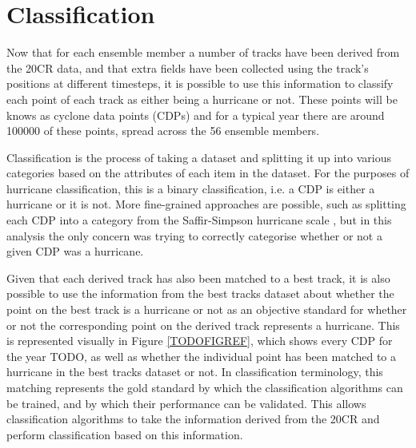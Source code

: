 \documentclass[pdftex,12pt,a4paper]{report}
\begin{document}



\section{Classification}


Now that for each ensemble member a number of tracks have been derived from the 20CR data, and that
extra fields have been collected using the track's positions at different timesteps, it is possible
to use this information to classify each point of each track as either being a hurricane or not.
These points will be knows as cyclone data points (CDPs) and for a typical year there are around
100000 of these points, spread across the 56 ensemble members.

Classification is the process of taking a dataset and splitting it up into various categories based
on the attributes of each item in the dataset. For the purposes of hurricane classification, this is
a binary classification, i.e. a CDP is either a hurricane or it is not. More fine-grained approaches
are possible, such as splitting each CDP into a category from the Saffir-Simpson hurricane scale
\parencite{TODOCITE}, but in this analysis the only concern was trying to correctly categorise whether or
not a given CDP was a hurricane.

Given that each derived track has also been matched to a best track, it is also possible to use the
information from the best tracks dataset about whether the point on the best track is a hurricane or
not as an objective standard for whether or not the corresponding point on the derived track
represents a hurricane. This is represented visually in Figure \ref{TODOFIGREF}, which shows every
CDP for the year TODO, as well as whether the individual point has been matched to a hurricane in
the best tracks dataset or not. In classification terminology, this matching represents the gold
standard by which the classification algorithms can be trained, and by which their performance can
be validated.  This allows classification algorithms to take the information derived from the 20CR
and perform classification based on this information.
\end{document}
